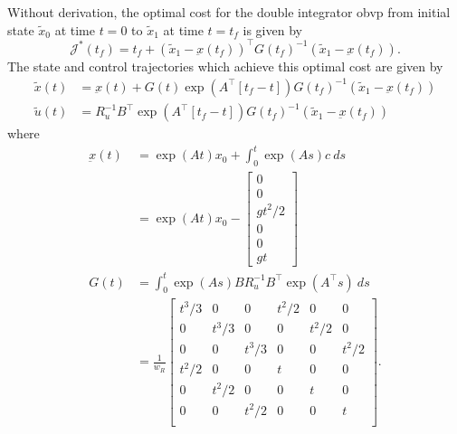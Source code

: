 Without derivation, the optimal cost for the double integrator \gls{obvp} from initial state $\tilde{x}_0$ at time $t=0$ to $\tilde{x}_1$ at time $t=t_f$ is given by~\cite{Schmerling2015, Allen2016}
\begin{equation}
    \mathcal{J}^*(t_f) =
    t_f + {(\tilde{x}_1 - \underbar{x}(t_f))}^\top {G(t_f)}^{-1} (\tilde{x}_1 - \underbar{x}(t_f)).
\label{quad:eqn:opt_cost}
\end{equation}
The state and control trajectories which achieve this optimal cost are given by
\begin{align}
    \tilde{x}(t) &= \underbar{x}(t) + G(t)\exp(A^\top[t_f - t]){G(t_f)}^{-1} (\tilde{x}_1 - \underbar{x}(t_f)) \\
    \tilde{u}(t) &= R_u^{-1} B^\top \exp(A^\top[t_f - t]){G(t_f)}^{-1} (\tilde{x}_1 - \underbar{x}(t_f))
\end{align}
where
\begin{align}
    \underbar{x}(t) &= \exp(At)x_0 + \int_0^t \exp(As)c\ ds \\
               &= \exp(At)x_0
                  -
                  \begin{bmatrix}
                      0 \\
                      0 \\
                      gt^2/2 \\
                      0 \\
                      0 \\
                      gt
                  \end{bmatrix} \\
    G(t)  &= \int_0^t \exp(As)B R_u^{-1} B^\top \exp(A^\top s)\ ds  \\
          &= \frac{1}{w_R}
          \begin{bmatrix}
            t^3/3   &  0  &  0  & t^2/2 &  0  &  0 \\
            0  &  t^3/3   &  0  &  0  & t^2/2 &  0 \\
            0  &  0  & t^3/3   &  0  &  0  & t^2/2 \\
            t^2/2 &  0  &  0  & t  &  0  &  0 \\
            0  & t^2/2 &  0  &  0  & t  &  0 \\
            0  &  0 & t^2/2 &  0  &  0  & t \\
          \end{bmatrix}.
\end{align}

